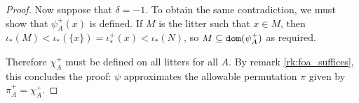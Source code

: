 \documentclass[112pt]{article}
\theoremstyle{definition}
\newtheorem{definition}[theorem]{Definition}
\theoremstyle{remark}
\begin{document}
\begin{proof}
  Now suppose that $\delta = -1$.
  To obtain the same contradiction, we must show that $\psi_A^+(x)$ is defined.
  If $M$ is the litter such that $x \in M$, then $\iota_*(M) < \iota_*(\{x\}) = \iota_*^+(x) < \iota_*(N)$, so $M \subseteq {\tt dom}(\psi_A^+)$ as required.

  Therefore $\chi_A^+$ must be defined on all litters for all $A$.
  By remark \ref{rk:foa_suffices}, this concludes the proof: $\psi$ approximates the allowable permutation $\pi$ given by $\pi_A^+ = \chi_A^+$.
\end{proof}

\begin{comment}

\begin{definition}[approximation]\label{def:approximation}
A {\em $\beta$-approximation\/} is a map $\pi^0$ from finite subsets of $\lambda$ with maximum element $\beta$ such
that each $\pi^0(A)$ (which we write $\pi^0_A$) is a function with the following properties:

\begin{enumerate}

\item  The domain and image of $\pi^0_A$ are the same and $\pi^0_A$ is injective.

\item Each domain element $x$ of $\pi^0_A$ is such that $(x,A)$ is a support condition.

\item $x$ and $\pi^0_A(x)$ have the same cardinality, which is either 1 or $\kappa$, since the previous condition tells us that $x$ is a singleton of an  atom or a near-litter.

\item if the cardinality of $x$ is $\kappa$, $x$ and $\pi^0_A(x)$ are litters.

\item  for any litter $L$, the collection of $y$ in the domain of $\pi^0_A$ such that $y \subseteq L$ is small.



\end{enumerate}

We say that $\pi^0$ approximates a $\beta$-allowable permutation $\pi$ just in case $\pi^+_A``x = \pi^0_A(x)$ if
$x$ has cardinality 1, and $\pi^+_A``x \sim \pi^0_A(x)$ otherwise, for each $(x,A)$ in the domain of $\pi^0$.

Notice that each such $\pi^0$ has an inverse $(\pi_0)^{-1}$ determined by $(\pi^0)^{-1}_A = (\pi^0_A)^{-1}$, which is also a $\beta$-approximation.
\end{definition}


\end{comment}
\end{document}
